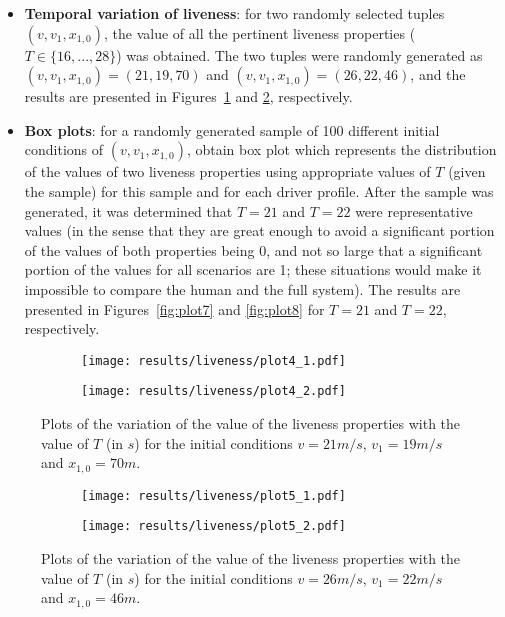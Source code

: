\begin{itemize}
	\item \textbf{Temporal variation of liveness}: for two randomly selected tuples $(v, v_1, x_{1,0})$, the value of all the pertinent liveness properties ($T \in \{16,...,28\}$) was obtained. The two tuples were randomly generated as $(v, v_1, x_{1,0}) = (21, 19, 70)$ and $(v, v_1, x_{1,0}) = (26, 22, 46)$, and the results are presented in Figures~\ref{fig:plot4} and \ref{fig:plot5}, respectively.
	\item \textbf{Box plots}: for a randomly generated sample of 100 different initial conditions of $(v, v_1, x_{1,0})$, obtain box plot which represents the distribution of the values of two liveness properties using appropriate values of $T$ (given the sample) for this sample and for each driver profile. After the sample was generated, it was determined that $T=21$ and $T=22$ were representative values (in the sense that they are great enough to avoid a significant portion of the values of both properties being 0, and not so large that a significant portion of the values for all scenarios are 1; these situations would make it impossible to compare the human and the full system). The results are presented in Figures~\ref{fig:plot7} and \ref{fig:plot8} for $T=21$ and $T=22$, respectively.
\end{itemize}

\begin{figure}[H]
\centering
\begin{subfigure}{0.49\textwidth}
  \centering
  \texttt{[image: results/liveness/plot4\_1.pdf]}
\end{subfigure}
\begin{subfigure}{0.49\textwidth}
  \centering
  \texttt{[image: results/liveness/plot4\_2.pdf]}
\end{subfigure} 
\caption{Plots of the variation of the value of the liveness properties with the value of $T$ (in $s$) for the initial conditions $v = 21m/s$, $v_1 = 19m/s$ and $x_{1,0} = 70m$.}
\label{fig:plot4}
\end{figure}

\begin{figure}[H]
\centering
\begin{subfigure}{0.49\textwidth}
  \centering
  \texttt{[image: results/liveness/plot5\_1.pdf]}
\end{subfigure}
\begin{subfigure}{0.49\textwidth}
  \centering
  \texttt{[image: results/liveness/plot5\_2.pdf]}
\end{subfigure} 
\caption{Plots of the variation of the value of the liveness properties with the value of $T$ (in $s$) for the initial conditions $v = 26m/s$, $v_1 = 22m/s$ and $x_{1,0} = 46m$.}
\label{fig:plot5}
\end{figure}

